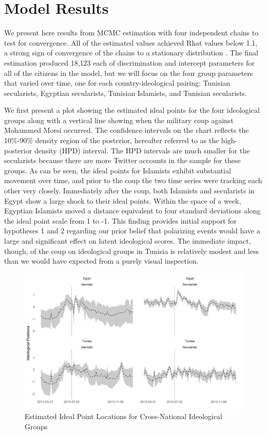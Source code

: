 \documentclass[12pt]{article}
\begin{document}
\section*{Model Results}

We present here results from MCMC estimation with four independent chains to test for convergence. All of the estimated values achieved Rhat values below 1.1, a strong sign of convergence of the chains to a stationary distribution \parencite{gelman1992}. The final estimation produced 18,123 each of discrimination and intercept parameters for all of the citizens in the model, but we will focus on the four group parameters that varied over time, one for each country-ideological pairing: Tunisian secularists, Egyptian secularists, Tunisian Islamists, and Tunisian secularists.

We first present a plot showing the estimated ideal points for the four ideological groups along with a vertical line showing when the military coup against Mohammed Morsi occurred. The confidence intervals on the chart reflects the 10\%-90\% density region of the posterior, hereafter referred to as the high-posterior density (HPD) interval. The HPD intervals are much smaller for the secularists because there are more Twitter accounts in the sample for these groups. As can be seen, the ideal points for Islamists exhibit substantial movement over time, and prior to the coup the two time series were tracking each other very closely. Immediately after the coup, both Islamists and secularists in Egypt show a large shock to their ideal points. Within the space of a week, Egyptian Islamists moved a distance equivalent to four standard deviations along the ideal point scale from 1 to -1. This finding provides initial support for hypotheses 1 and 2 regarding our prior belief that polarizing events would have a large and significant effect on latent ideological scores. The immediate impact, though, of the coup on ideological groups in Tunisia is relatively modest and less than we would have expected from a purely visual inspection.
 \begin{figure}[!h]
 	\centering
	\caption{Estimated Ideal Point Locations for Cross-National Ideological Groups}\label{arab_id_facet}
	\centering
	\includegraphics[width=.9\linewidth]{arab_ideology}
\end{figure}
\end{document}
